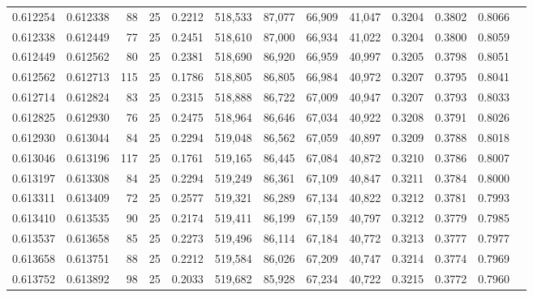 \begin{tabular}{rrrrrrrrrrrrr}
0.612254 & 0.612338 &    88 &  25 &                                     0.2212 & 518,533 &  87,077 &  66,909 &  41,047 & 0.3204 & 0.3802 & 0.8066 \\
0.612338 & 0.612449 &    77 &  25 &                                     0.2451 & 518,610 &  87,000 &  66,934 &  41,022 & 0.3204 & 0.3800 & 0.8059 \\
0.612449 & 0.612562 &    80 &  25 &                                     0.2381 & 518,690 &  86,920 &  66,959 &  40,997 & 0.3205 & 0.3798 & 0.8051 \\
0.612562 & 0.612713 &   115 &  25 &                                     0.1786 & 518,805 &  86,805 &  66,984 &  40,972 & 0.3207 & 0.3795 & 0.8041 \\
0.612714 & 0.612824 &    83 &  25 &                                     0.2315 & 518,888 &  86,722 &  67,009 &  40,947 & 0.3207 & 0.3793 & 0.8033 \\
0.612825 & 0.612930 &    76 &  25 &                                     0.2475 & 518,964 &  86,646 &  67,034 &  40,922 & 0.3208 & 0.3791 & 0.8026 \\
0.612930 & 0.613044 &    84 &  25 &                                     0.2294 & 519,048 &  86,562 &  67,059 &  40,897 & 0.3209 & 0.3788 & 0.8018 \\
0.613046 & 0.613196 &   117 &  25 &                                     0.1761 & 519,165 &  86,445 &  67,084 &  40,872 & 0.3210 & 0.3786 & 0.8007 \\
0.613197 & 0.613308 &    84 &  25 &                                     0.2294 & 519,249 &  86,361 &  67,109 &  40,847 & 0.3211 & 0.3784 & 0.8000 \\
0.613311 & 0.613409 &    72 &  25 &                                     0.2577 & 519,321 &  86,289 &  67,134 &  40,822 & 0.3212 & 0.3781 & 0.7993 \\
0.613410 & 0.613535 &    90 &  25 &                                     0.2174 & 519,411 &  86,199 &  67,159 &  40,797 & 0.3212 & 0.3779 & 0.7985 \\
0.613537 & 0.613658 &    85 &  25 &                                     0.2273 & 519,496 &  86,114 &  67,184 &  40,772 & 0.3213 & 0.3777 & 0.7977 \\
0.613658 & 0.613751 &    88 &  25 &                                     0.2212 & 519,584 &  86,026 &  67,209 &  40,747 & 0.3214 & 0.3774 & 0.7969 \\
0.613752 & 0.613892 &    98 &  25 &                                     0.2033 & 519,682 &  85,928 &  67,234 &  40,722 & 0.3215 & 0.3772 & 0.7960 \\

\end{tabular}
